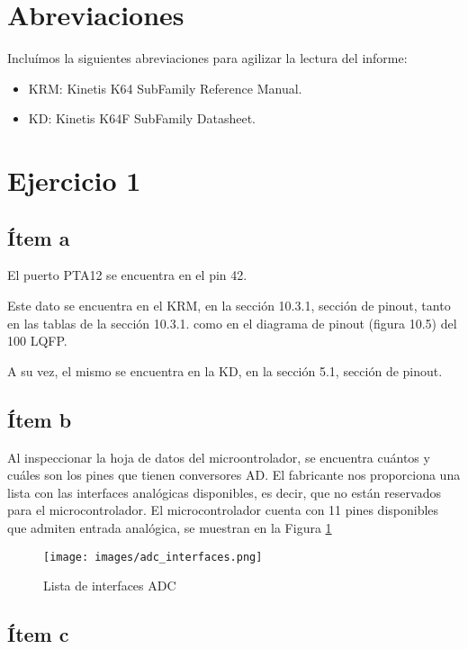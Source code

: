 \documentclass[micros_g1_main.tex]{subfiles}
\begin{document}
\section{Abreviaciones}

Incluímos la siguientes abreviaciones para agilizar la lectura del informe:

	\begin{itemize}
		\item KRM: Kinetis K64 SubFamily Reference Manual.
		\item KD: Kinetis K64F SubFamily Datasheet.
	\end{itemize}
	
\section{Ejercicio 1}


\subsection{Ítem a}
El puerto PTA12 se encuentra en el pin 42.\par
Este dato se encuentra en el KRM, en la sección 10.3.1, sección de pinout, tanto en las tablas de la sección 10.3.1. como en el diagrama de pinout (figura 10.5) del 100 LQFP. \par
A su vez, el mismo se encuentra en la KD, en la sección 5.1, sección de pinout.

\subsection{Ítem b}
Al inspeccionar la hoja de datos del microontrolador, se encuentra cuántos y cuáles son los pines que tienen conversores AD. El fabricante nos proporciona una lista con las interfaces analógicas disponibles, es decir, que no están reservados para el microcontrolador. El microcontrolador cuenta con 11 pines disponibles que admiten entrada analógica, se muestran en la Figura \ref{fig:adc_interfaces}

\begin{figure}[ht]
\centering
\texttt{[image: images/adc\_interfaces.png]}
\caption{Lista de interfaces ADC}
\label{fig:adc_interfaces}
\end{figure}

\subsection{Ítem c}
\end{document}
